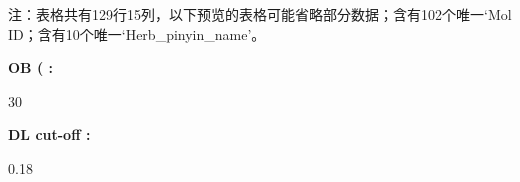 \documentclass[
]{article}
\begin{document}
\begin{center}\begin{tcolorbox}[colback=gray!10, colframe=gray!50, width=0.9\linewidth, arc=1mm, boxrule=0.5pt]注：表格共有129行15列，以下预览的表格可能省略部分数据；含有102个唯一`Mol ID；含有10个唯一`Herb\_pinyin\_name'。
\end{tcolorbox}
\end{center}\begin{center}\begin{tcolorbox}[colback=gray!10, colframe=gray!50, width=0.9\linewidth, arc=1mm, boxrule=0.5pt]
\textbf{
OB (%
:}

\vspace{0.5em}

    30%

\vspace{2em}


\textbf{
DL cut-off
:}

\vspace{0.5em}

    0.18

\vspace{2em}
\end{tcolorbox}
\end{center}
\end{document}
